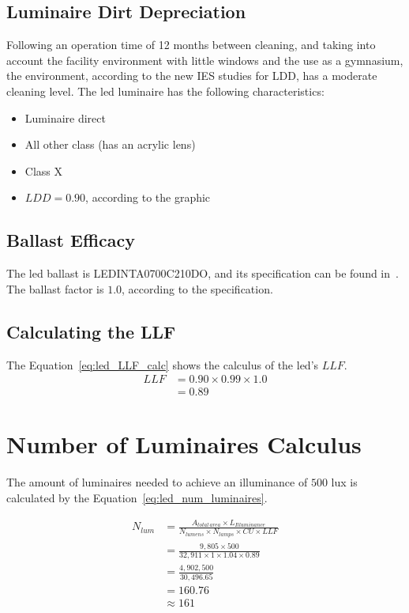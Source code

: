 \subsection{Luminaire Dirt Depreciation}
Following an operation time of 12 months between cleaning, and taking into account the facility environment with little windows and the use as a gymnasium, the environment, according to the new IES studies for LDD, has a moderate cleaning level. The led luminaire has the following characteristics:
\begin{itemize}
\item Luminaire direct
\item All other class (has an acrylic lens)
\item Class X
\item $LDD = 0.90$, according to the graphic
\end{itemize}

\subsection{Ballast Efficacy}
The led ballast is LEDINTA0700C210DO, and its specification can be found in~\cite{www:led_ballast}. The ballast factor is $1.0$, according to the specification.

\subsection{Calculating the LLF}
The Equation~\ref{eq:led_LLF_calc} shows the calculus of the led's $LLF$.
\begin{equation}
\begin{split}
LLF &= 0.90 \times 0.99 \times 1.0 \\
    &= 0.89
\end{split}
\label{eq:led_LLF_calc}
\end{equation}

\section{Number of Luminaires Calculus}
The amount of luminaires needed to achieve an illuminance of $500$ lux is calculated by the Equation~\ref{eq:led_num_luminaires}.

\begin{equation}
\begin{split}
N_{lum} & = \frac{A_{total\,area} \times L_{Illuminance}}
                {N_{lumens} \times N_{lamps} \times CU \times LLF} \\
 & = \frac{9,805 \times 500}
          {32,911 \times 1 \times 1.04 \times 0.89} \\
 & = \frac{4,902,500}
          {30,496.65} \\
 & = 160.76 \\
 & \approx 161
\end{split}
\label{eq:led_num_luminaires}
\end{equation}

